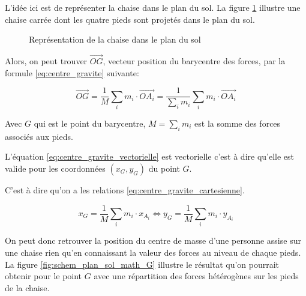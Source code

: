 \documentclass{polytech/polytech}
\begin{document}
L'idée ici est de représenter la chaise dans le plan du sol. La figure \ref{fig:schem_plan_sol_math} illustre une chaise carrée dont les quatre pieds sont projetés dans le plan du sol.


\begin{figure}[htbp]
\begin{center}
\end{center}
\caption{Représentation de la chaise dans le plan du sol}
\label{fig:schem_plan_sol_math}
\end{figure}

Alors, on peut trouver $\vec{OG}$, vecteur position du barycentre des forces, par la formule \eqref{eq:centre_gravite}  suivante:

\begin{equation}
\label{eq:centre_gravite_vectorielle}
\vec{OG} = \frac{1}{M} \sum_i m_i  \cdot \vec{OA_i} =   \frac{1}{\sum_i m_i} \sum_i m_i  \cdot \vec{OA_i} 
\end{equation}

Avec $G$ qui est le point du barycentre, $M=\sum_i m_i$ est la somme des forces associés aux pieds.

L'équation \eqref{eq:centre_gravite_vectorielle} est vectorielle c'est à dire qu'elle est valide pour les coordonnées $(x_G,y_G)$ du point $G$.

C'est à dire qu'on a les relations \eqref{eq:centre_gravite_cartesienne}.

\begin{equation}
\label{eq:centre_gravite_cartesienne}
x_G = \frac{1}{M} \sum_i m_i  \cdot x_{A_i} \Leftrightarrow  y_G = \frac{1}{M} \sum_i m_i  \cdot y_{A_i}
\end{equation}

On peut donc retrouver la position du centre de masse d'une personne assise sur une chaise rien qu'en connaissant la valeur des forces au niveau de chaque pieds. La figure \ref{fig:schem_plan_sol_math_G} illustre le résultat qu'on pourrait obtenir pour le point $G$ avec une répartition des forces hétérogènes sur les pieds de la chaise.
\end{document}
